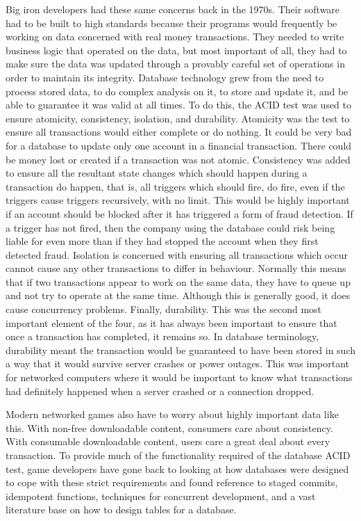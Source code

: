 \documentclass[a4paper,12pt]{article}
\begin{document}
Big iron developers had these same concerns back in the 1970s.
Their software had to be built to high standards because their programs would frequently be working on data concerned with real money transactions.
They needed to write business logic that operated on the data, but most important of all, they had to make sure the data was updated through a provably careful set of operations in order to maintain its integrity.
Database technology grew from the need to process stored data, to do complex analysis on it, to store and update it, and be able to guarantee it was valid at all times.
To do this, the ACID test was used to ensure atomicity, consistency, isolation, and durability.
Atomicity was the test to ensure all transactions would either complete or do nothing.
It could be very bad for a database to update only one account in a financial transaction.
There could be money lost or created if a transaction was not atomic.
Consistency was added to ensure all the resultant state changes which should happen during a transaction do happen, that is, all triggers which should fire, do fire, even if the triggers cause triggers recursively, with no limit.
This would be highly important if an account should be blocked after it has triggered a form of fraud detection.
If a trigger has not fired, then the company using the database could risk being liable for even more than if they had stopped the account when they first detected fraud.
Isolation is concerned with ensuring all transactions which occur cannot cause any other transactions to differ in behaviour.
Normally this means that if two transactions appear to work on the same data, they have to queue up and not try to operate at the same time.
Although this is generally good, it does cause concurrency problems.
Finally, durability.
This was the second most important element of the four, as it has always been important to ensure that once a transaction has completed, it remains so.
In database terminology, durability meant the transaction would be guaranteed to have been stored in such a way that it would survive server crashes or power outages.
This was important for networked computers where it would be important to know what transactions had definitely happened when a server crashed or a connection dropped.

Modern networked games also have to worry about highly important data like this.
With non-free downloadable content, consumers care about consistency.
With consumable downloadable content, users care a great deal about every transaction.
To provide much of the functionality required of the database ACID test, game developers have gone back to looking at how databases were designed to cope with these strict requirements and found reference to staged commits, idempotent functions, techniques for concurrent development, and a vast literature base on how to design tables for a database.
\end{document}
